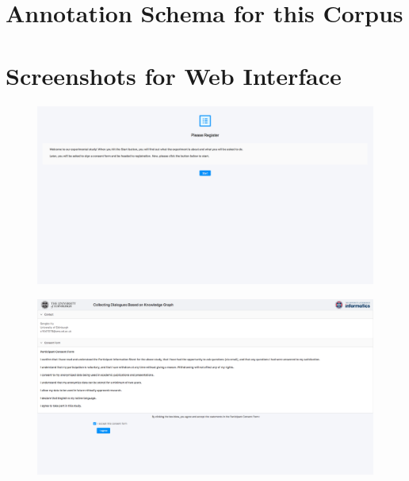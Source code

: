 \documentclass[bsc,frontabs,twoside,singlespacing,parskip,deptreport]{infthesis}     %
\begin{document}



\appendix
\chapter{Annotation Schema for this Corpus}
\label{appendix:annotation}


\chapter{Screenshots for Web Interface}
\label{fig:interface}

\begin{figure}[h]
    \centering
    \includegraphics[width=\textwidth]{regi.png}
    
    
    \label{fig:regi}
\end{figure}


\begin{figure}[h]
    \includegraphics[width=\textwidth]{conssent.png}
    \label{fig:cons}
\end{figure}
\end{document}
